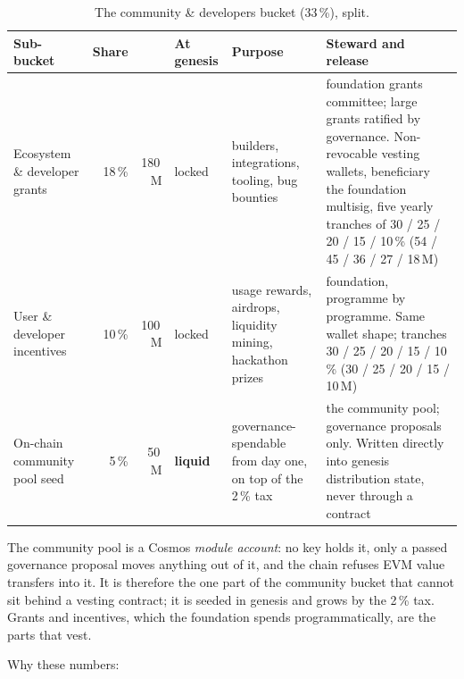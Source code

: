 \begin{table}[tbp]
\centering
\small
\begin{tabularx}{\textwidth}{@{}>{\raggedright\arraybackslash}p{2.4cm}rrlLL@{}}
\toprule
Sub-bucket & Share & \kash{} & At genesis & Purpose & Steward and release \\
\midrule
Ecosystem \& developer grants & 18\,\% & 180\,M & locked & builders, integrations, tooling, bug bounties & foundation grants committee; large grants ratified by governance. Non-revocable vesting wallets, beneficiary the foundation multisig, five yearly tranches of 30 / 25 / 20 / 15 / 10\,\% (54 / 45 / 36 / 27 / 18\,M) \\
User \& developer incentives & 10\,\% & 100\,M & locked & usage rewards, airdrops, liquidity mining, hackathon prizes & foundation, programme by programme. Same wallet shape; tranches 30 / 25 / 20 / 15 / 10\,\% (30 / 25 / 20 / 15 / 10\,M) \\
On-chain community pool seed & 5\,\% & 50\,M & \textbf{liquid} & governance-spendable from day one, on top of the 2\,\% tax & the  community pool; governance proposals only. Written directly into genesis distribution state, never through a contract \\
\bottomrule
\end{tabularx}
\caption{The community \& developers bucket (33\,\%), split.}
\label{tab:community}
\end{table}

The community pool is a Cosmos \emph{module account}: no key holds it, only a
passed governance proposal moves anything out of it, and the chain refuses EVM
value transfers into it. It is therefore the one part of the community bucket
that cannot sit behind a vesting contract; it is seeded in genesis and grows
by the 2\,\% tax. Grants and incentives, which the foundation spends
programmatically, are the parts that vest.

Why these numbers:


